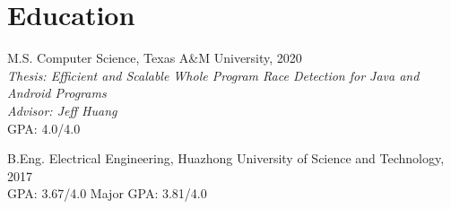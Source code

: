 \documentclass[12pt,letterpaper]{report}
\begin{document}
\section*{Education}

\begin{tablist}


	\item[M.S.]  \tab Computer Science, Texas A\&M University, 2020 \\
	\textit{Thesis: Efficient and Scalable Whole Program Race Detection for Java and Android Programs}\\
	\textit{Advisor: Jeff Huang}\\
	GPA: 4.0/4.0

	\item[B.Eng.]  \tab Electrical Engineering, Huazhong University of Science and Technology, 2017 \\
	GPA: 3.67/4.0 \hspace{0.5cm} Major GPA: 3.81/4.0

\end{tablist}


\end{document}
